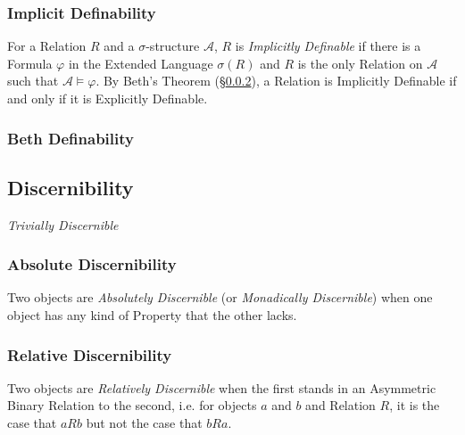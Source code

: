 \subsubsection{Implicit Definability}\label{sec:implicit_definability}

For a Relation $R$ and a $\sigma$-structure $\mathcal{A}$, $R$ is
\emph{Implicitly Definable} if there is a Formula $\varphi$ in the
Extended Language $\sigma(R)$ and $R$ is the only Relation on
$\mathcal{A}$ such that $\mathcal{A} \models \varphi$. By Beth's
Theorem (\S\ref{sec:beth_definability}), a Relation is Implicitly
Definable if and only if it is Explicitly Definable.



\subsubsection{Beth Definability}\label{sec:beth_definability}



\subsection{Discernibility}\label{sec:discernibility}
\cite{ladyman-linnebo-pettigrew11}

\emph{Trivially Discernible}



\subsubsection{Absolute Discernibility}\label{sec:absolute_discernibility}

Two objects are \emph{Absolutely Discernible} (or \emph{Monadically
  Discernible}) when one object has any kind of Property that the
other lacks.



\subsubsection{Relative Discernibility}\label{sec:relative_discernibility}

Two objects are \emph{Relatively Discernible} when the first stands in
an Asymmetric Binary Relation to the second, i.e. for objects $a$ and
$b$ and Relation $R$, it is the case that $aRb$ but not the case that
$bRa$.



